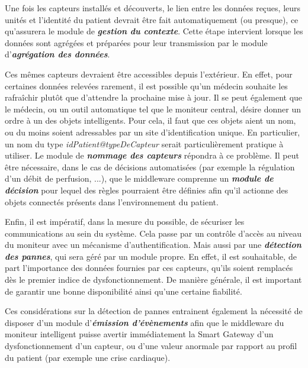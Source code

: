 Une fois les capteurs installés et découverts, le lien entre les données reçues, leurs unités et l'identité du patient devrait être fait automatiquement (ou presque), ce qu'assurera le module de \textbf{\textit{gestion du contexte}}. Cette étape intervient lorsque les données sont agrégées et préparées pour leur transmission par le module d'\textbf{\textit{agrégation des données}}.

Ces mêmes capteurs devraient être accessibles depuis l'extérieur. En effet, pour certaines données relevées rarement, il est possible qu'un médecin souhaite les rafraîchir plutôt que d'attendre la prochaine mise à jour. Il se peut également que le médecin, ou un outil automatique tel que le moniteur central, désire donner un ordre à un des objets intelligents. Pour cela, il faut que ces objets aient un nom, ou du moins soient adressables par un site d'identification unique. En particulier, un nom du type \textit{idPatient@typeDeCapteur} serait particulièrement pratique à utiliser. Le module de \textbf{\textit{nommage des capteurs}} répondra à ce problème. Il peut être nécessaire, dans le cas de décisions automatisées (par exemple la régulation d'un débit de perfusion, ...), que le middleware comprenne un \textbf{\textit{module de décision}} pour lequel des règles pourraient être définies afin qu'il actionne des objets connectés présents dans l'environnement du patient.
\newline

Enfin, il est impératif, dans la mesure du possible, de sécuriser les communications au sein du système. Cela passe par un
contrôle d'accès au niveau du moniteur avec un mécanisme d'authentification. Mais aussi par une \textbf{\textit{détection des pannes}}, qui sera géré par un module propre. En effet, il
est souhaitable, de part l'importance des données fournies par ces capteurs, qu'ils soient remplacés dès le premier indice
de dysfonctionnement. De manière générale, il est important de garantir une bonne disponibilité ainsi qu'une certaine fiabilité.
\newline

Ces considérations sur la détection de pannes entrainent également la nécessité de disposer d'un module d'\textbf{\textit{émission d'évènements}} afin que le middleware du moniteur intelligent puisse avertir immédiatement la Smart Gateway d'un dysfonctionnement d'un capteur, ou d'une valeur anormale par rapport au profil du patient (par exemple une crise cardiaque).
\newline

